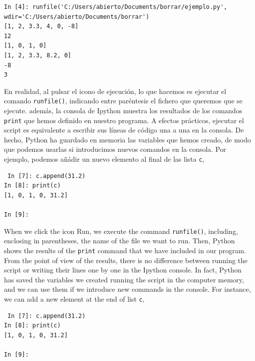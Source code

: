 \begin{verbatim}
In [4]: runfile('C:/Users/abierto/Documents/borrar/ejemplo.py', 
wdir='C:/Users/abierto/Documents/borrar')
[1, 2, 3.3, 4, 0, -8]
12
[1, 0, 1, 0]
[1, 2, 3.3, 8.2, 0]
-8
3
\end{verbatim}
\begin{paracol}{2}
En realidad, al pulsar el icono de ejecución, lo que hacemos es ejecutar el comando \texttt{runfile()}, indicando entre paréntesis el fichero que queremos que se ejecute. además, la consola de Ipython muestra los resultados de los comandos \texttt{print} que hemos definido en nuestro programa. A efectos prácticos, ejecutar el script es equivalente a escribir sus líneas de código una a una en la consola. De hecho, Python ha guardado en memoria las variables que hemos creado, de modo que podemos usarlas si introducimos nuevos comandos en la consola. Por ejemplo, podemos añádir un nuevo elemento al final de las lista \texttt{c},
\begin{verbatim}
 In [7]: c.append(31.2)
In [8]: print(c)
[1, 0, 1, 0, 31.2]

In [9]:    
\end{verbatim}
\switchcolumn
When we click the icon Run, we execute the command \texttt{runfile()}, including, enclosing in parentheses, the name of the file we want to run. Then, Python shows the results of the \texttt{print} command that we have included in our program. From the point of view of the results, there is no difference between running the script or writing their lines one by one in the Ipython console. In fact, Python has saved the variables we created running the script in the computer memory, and we can use them if we introduce new commands in the console. For instance, we can add a new element at the end of list \texttt{c},
\begin{verbatim}
 In [7]: c.append(31.2)
In [8]: print(c)
[1, 0, 1, 0, 31.2]

In [9]:    
\end{verbatim}
\end{paracol}
